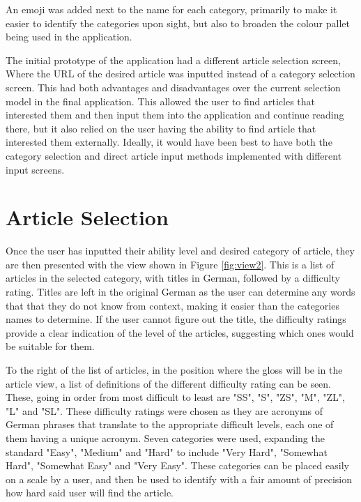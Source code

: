 An emoji was added next to the name for each category, primarily to make it easier to identify the categories upon sight, but also to broaden the colour pallet being used in the application.

The initial prototype of the application had a different article selection screen, Where the URL of the desired article was inputted instead of a category selection screen. This had both advantages and disadvantages over the current selection model in the final application. This allowed the user to find articles that interested them and then input them into the application and continue reading there, but it also relied on the user having the ability  to find article that interested them externally. Ideally, it would have been best to have both the category selection and direct article input methods implemented with different input screens.

\section{Article Selection}

Once the user has inputted their ability level and desired category of article, they are then presented with the view shown in Figure \ref{fig:view2}. This is a list of articles in the selected category, with titles in German, followed by a difficulty rating. Titles are left in the original German as the user can determine any words that that they do not know from context, making it easier than the categories names to determine. If the user cannot figure out the title, the difficulty ratings provide a clear indication of the level of the articles, suggesting which ones would be suitable for them. 



To the right of the list of articles, in the position where the gloss will be in the article view, a list of definitions of the different difficulty rating can be seen. These, going in order from most difficult to least are "SS", "S", "ZS", "M", "ZL", "L" and "SL". These difficulty ratings were chosen as they are acronyms of German phrases that translate to the appropriate difficult levels, each one of them having a unique acronym. Seven categories were used, expanding the standard "Easy", "Medium" and "Hard" to include "Very Hard", "Somewhat Hard", "Somewhat Easy" and "Very Easy". These categories can be placed easily on a scale by a user, and then be used to identify with a fair amount  of precision how hard said user will find the article.

